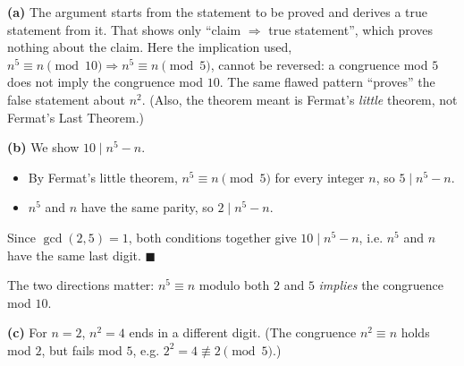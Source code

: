 \textbf{(a)} The argument starts from the statement to be proved and derives a true statement from it. That shows only ``claim $\Rightarrow$ true statement'', which proves nothing about the claim. Here the implication used, $n^5\equiv n\pmod{10}\Rightarrow n^5\equiv n\pmod5$, cannot be reversed: a congruence mod $5$ does not imply the congruence mod $10$. The same flawed pattern ``proves'' the false statement about $n^2$. (Also, the theorem meant is Fermat's \emph{little} theorem, not Fermat's Last Theorem.)

\textbf{(b)} We show $10\mid n^5-n$.
\begin{itemize}
\item By Fermat's little theorem, $n^5\equiv n\pmod5$ for every integer $n$, so $5\mid n^5-n$.
\item $n^5$ and $n$ have the same parity, so $2\mid n^5-n$.
\end{itemize}
Since $\gcd(2,5)=1$, both conditions together give $10\mid n^5-n$, i.e. $n^5$ and $n$ have the same last digit. $\blacksquare$

The two directions matter: $n^5\equiv n$ modulo both $2$ and $5$ \emph{implies} the congruence mod $10$.

\textbf{(c)} For $n=2$, $n^2=4$ ends in a different digit. (The congruence $n^2\equiv n$ holds mod $2$, but fails mod $5$, e.g. $2^2=4\not\equiv2\pmod 5$.)
